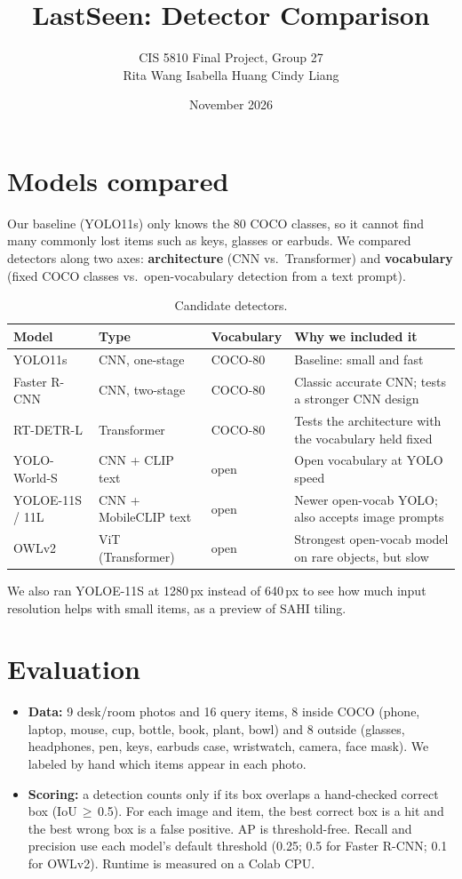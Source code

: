 \documentclass[11pt]{article}
\title{\textbf{LastSeen: Detector Comparison}}
\author{CIS 5810 Final Project, Group 27\\Rita Wang \quad Isabella Huang \quad Cindy Liang}
\date{November 2026}
\begin{document}
\maketitle

\section{Models compared}
Our baseline (YOLO11s) only knows the 80 COCO classes, so it cannot find many commonly lost items
such as keys, glasses or earbuds. We compared detectors along two axes: \textbf{architecture}
(CNN vs.\ Transformer) and \textbf{vocabulary} (fixed COCO classes vs.\ open-vocabulary detection from a
text prompt).

\begin{table}[h]
\centering\small
\caption{Candidate detectors.}
\label{tab:models}
\begin{tabularx}{\linewidth}{@{}l l l X@{}}
\toprule
Model & Type & Vocabulary & Why we included it \\
\midrule
YOLO11s & CNN, one-stage & COCO-80 & Baseline: small and fast \\
Faster R-CNN & CNN, two-stage & COCO-80 & Classic accurate CNN; tests a stronger CNN design \\
RT-DETR-L & Transformer & COCO-80 & Tests the architecture with the vocabulary held fixed \\
YOLO-World-S & CNN + CLIP text & open & Open vocabulary at YOLO speed \\
YOLOE-11S / 11L & CNN + MobileCLIP text & open & Newer open-vocab YOLO; also accepts image prompts \\
OWLv2 & ViT (Transformer) & open & Strongest open-vocab model on rare objects, but slow \\
\bottomrule
\end{tabularx}
\end{table}

We also ran YOLOE-11S at 1280\,px instead of 640\,px to see how much input resolution helps with small
items, as a preview of SAHI tiling.

\section{Evaluation}
\begin{itemize}
\item \textbf{Data:} 9 desk/room photos and 16 query items, 8 inside COCO (phone, laptop, mouse, cup,
  bottle, book, plant, bowl) and 8 outside (glasses, headphones, pen, keys, earbuds case, wristwatch,
  camera, face mask). We labeled by hand which items appear in each photo.
\item \textbf{Scoring:} a detection counts only if its box overlaps a hand-checked correct box
  (IoU\,$\ge$\,0.5). For each image and item, the best correct box is a hit and the best wrong box is a
  false positive. AP is threshold-free. Recall and precision use each model's default threshold
  (0.25; 0.5 for Faster R-CNN; 0.1 for OWLv2). Runtime is measured on a Colab CPU.
\end{itemize}
\end{document}
